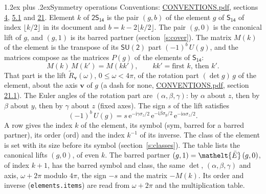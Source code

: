 \documentclass[10pt,a4paper]{article}
\makeatletter
\renewcommand\section{\@startsection{section}{1}{\z@}{-3ex plus -1ex minus -.2ex}%
  {1.2ex plus .2ex}{\normalfont\large\sffamily\bfseries\color{parttitle}}}
\numberwithin{equation}{section}
\newcommand{\eltfont}[1]{{\let\sigma\eltsigma\mathelt{#1}}}
\newcommand{\grp}[1]{\mathsf{#1}}
\newcommand{\elt}[1]{\eltfont{#1}}
\newcommand{\vv}{\mathbf{v}}
\newcommand{\iunit}{\mathrm{i}}
\newcommand{\expe}{\mathrm{e}}
\newcommand{\barred}[1]{\bar{#1}}
\newcommand{\lift}[1]{\tilde{#1}}
\newcommand{\pauli}[1]{\sigma_{#1}}
\makeatother
\begin{document}
\section{Symmetry operations}\label{s:elements}
Conventions: \href{../../CONVENTIONS.pdf}{CONVENTIONS.pdf}, sections \href{../../../rotation/CONVENTIONS.pdf\#conv.4}{4}, \href{../../../rotation/CONVENTIONS.pdf\#conv.5.1}{5.1} and \href{../../CONVENTIONS.pdf\#conv.21}{21}.
\leavevmode\label{n:index.element}\label{n:element.g}Element $k$ of $\grp{2S_{14}}$ is the pair $(g, b)$ of the element $g$ of \href{../../../rotation/data/pdf/S14.pdf}{$\grp{S_{14}}$} of index $\lfloor k/2\rfloor$ in its document and $b = k - 2\lfloor k/2\rfloor$. The pair $(g, 0)$ is the canonical lift of $g$, and $(g, 1)$ is its barred partner (section~\ref{s:cover}). \label{n:matrix.element.pin}\label{n:matrix.element}The matrix $M(k)$ of the element is the transpose of its $\grp{SU(2)}$ part $(-1)^{b}\,U(g)$, and the matrices compose as the matrices $P(g)$ of the elements of $\grp{S_{14}}$:
\begin{equation}\label{e:mprod}M(k)\,M(k') = M(kk'),\qquad kk' = \text{first } k\text{, then } k'.\end{equation}
\leavevmode\label{n:angle.omega}\label{n:vector.axis}\label{n:vector.pole}That part is the lift $\lift{R}_{\vv}(\omega)$, $0 \le \omega < 4\pi$, of the rotation part $(\det g)\,g$ of the element, about the axis $\vv$ of $g$ (a dash for none, \href{../../CONVENTIONS.pdf}{CONVENTIONS.pdf}, section \href{../../CONVENTIONS.pdf\#conv.21.1}{21.1}). \label{n:angle.euler.alpha}\label{n:angle.euler.beta}\label{n:angle.euler.gamma}\label{n:vector.coordinates}The Euler angles of the rotation part are $(\alpha,\beta,\gamma)$: by $\alpha$ about $z$, then by $\beta$ about $y$, then by $\gamma$ about $z$ (fixed axes). \label{n:local.euler.sign}The sign $s$ of the lift satisfies
\begin{equation}\label{e:euler}(-1)^{b}\,U(g) = s\,\expe^{-\iunit\gamma\pauli{z}/2}\,\expe^{-\iunit\beta\pauli{y}/2}\,\expe^{-\iunit\alpha\pauli{z}/2}.\end{equation}
\leavevmode\label{n:index.element.inverse}\label{n:head.sym}\label{n:head.ord}A row gives the index $k$ of the element, its symbol (sym, barred for a barred partner), its order (ord) and the index $k^{-1}$ of its inverse. \label{n:head.class}The class of the element is set with its size before its symbol (section~\ref{s:classes}).
The table lists the canonical lifts $(g, 0)$, of even $k$. The barred partner $(g, 1) = \elt{\barred{E}}\,(g, 0)$, of index $k + 1$, has the barred symbol and class, the same $\det$, $(\alpha,\beta,\gamma)$ and axis, $\omega + 2\pi$ modulo $4\pi$, the sign $-s$ and the matrix $-M(k)$. Its order and inverse (\texttt{elements.items}) are read from $\omega + 2\pi$ and the multiplication table.
\end{document}
